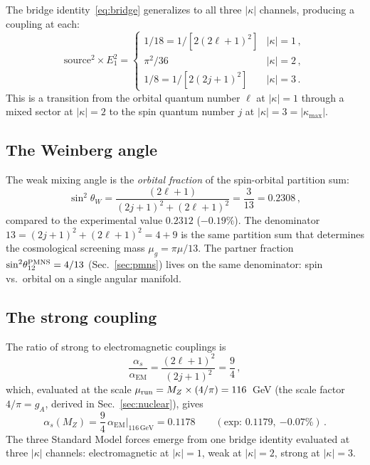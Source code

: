 \documentclass[aps,prd,twocolumn,superscriptaddress,nofootinbib,longbibliography]{revtex4-2}
\newcommand{\kmax}{|\kappa_{\mathrm{max}}|}
\newcommand{\mug}{\mu_g}
\newcommand{\aEM}{\alpha_{\mathrm{EM}}}
\begin{document}
The bridge identity~\eqref{eq:bridge} generalizes to all three
$|\kappa|$ channels, producing a coupling at each:
\begin{equation}\label{eq:bridge-gen}
  \mathrm{source}^2 \!\times E_1^2 =
  \begin{cases}
    1/18 = 1/[2(2\ell+1)^2] & |\kappa| = 1\,,\\
    \pi^2/36 & |\kappa| = 2\,,\\
    1/8 = 1/[2(2j+1)^2] & |\kappa| = 3\,.
  \end{cases}
\end{equation}
This is a transition from the orbital quantum number $\ell$ at
$|\kappa| = 1$ through a mixed sector at $|\kappa| = 2$ to the spin
quantum number $j$ at $|\kappa| = 3 = \kmax$.

\subsection{The Weinberg angle}

The weak mixing angle is the \emph{orbital fraction} of the
spin-orbital partition sum:
\begin{equation}\label{eq:weinberg}
  \sin^2\!\theta_W = \frac{(2\ell+1)}{(2j+1)^2 + (2\ell+1)^2}
  = \frac{3}{13} = 0.2308\,,
\end{equation}
compared to the experimental value $0.2312$ ($-0.19\%$).  The
denominator $13 = (2j+1)^2 + (2\ell+1)^2 = 4 + 9$ is the same
partition sum that determines the cosmological screening mass
$\mug = \pi\mu/13$.  The partner fraction
$\sin^2\!\theta_{12}^{\rm PMNS} = 4/13$ (Sec.~\ref{sec:pmns})
lives on the same denominator: spin vs.\ orbital on a single
angular manifold.

\subsection{The strong coupling}

The ratio of strong to electromagnetic couplings is
\begin{equation}\label{eq:alpha-ratio}
  \frac{\alpha_s}{\aEM} = \frac{(2\ell+1)^2}{(2j+1)^2}
  = \frac{9}{4}\,,
\end{equation}
which, evaluated at the scale $\mu_{\rm run} = M_Z \times (4/\pi)
= 116$~GeV (the scale factor $4/\pi = g_A$, derived in
Sec.~\ref{sec:nuclear}), gives
\begin{equation}
  \alpha_s(M_Z) = \frac{9}{4}\,\aEM\bigg|_{116\,\text{GeV}}
  = 0.1178
  \qquad(\text{exp: }0.1179,\ {-0.07\%})\,.
\end{equation}
The three Standard Model forces emerge from one bridge identity
evaluated at three $|\kappa|$ channels: electromagnetic at
$|\kappa| = 1$, weak at $|\kappa| = 2$, strong at $|\kappa| = 3$.
\end{document}
